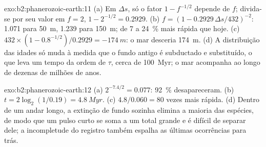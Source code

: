 \begin{solution}{exo:b2:phanerozoic-earth:11}
(a) Em $\Delta s$, só o fator $1 - f^{-1/2}$ depende de $f$; divida-se por seu valor em $f = 2$,
$1 - 2^{-1/2} = 0.2929$. (b) $f = (1 - 0.2929\,\Delta s/432)^{-2}$: 1.071 para \qty{50}{m}, 1.239
para \qty{150}{m}; de 7 a \qty{24}{\percent} mais rápida que hoje. (c) $432 \times (1 -
0.8^{-1/2})/0.2929 = \qty{-174}{m}$: o mar desceria \qty{174}{m}. (d) A distribuição das idades
só muda à medida que o fundo antigo é subductado e substituído, o que leva um tempo da ordem de $\tau$,
cerca de \qty{100}{Myr}; o mar acompanha ao longo de dezenas de milhões de anos.
\end{solution}

\begin{solution}{exo:b2:phanerozoic-earth:12}
(a) $2^{-7.4/2} = 0.077$: \qty{92}{\percent} desapareceram. (b) $t = 2\log_2(1/0.19) = \qty{4.8}{Myr}$.
(c) $4.8/0.060 = 80$ vezes mais rápida. (d) Dentro de um andar longo, a extinção de fundo sozinha elimina
a maioria das espécies, de modo que um pulso curto se soma a um total grande e é difícil de separar dele; a
incompletude do registro também espalha as últimas ocorrências para trás.
\end{solution}

